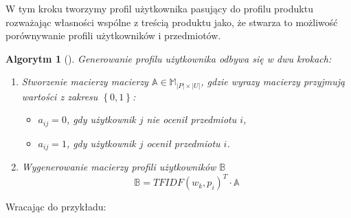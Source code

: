 \documentclass[12pt,a4paper]{report}
\newtheorem{algorytm}[df]{Algorytm}
\newcommand{\set}[1]{\left\lbrace {#1} \right\rbrace}
\newcommand{\setUzytkownicy}{\mathit{U}}
\newcommand{\setPrzedmioty}{\mathit{P}}
\begin{document}
W tym kroku tworzymy profil użytkownika pasujący do profilu produktu rozważając własności wspólne z treścią produktu jako, że stwarza to możliwość porównywanie profili użytkowników i przedmiotów.

\begin{algorytm}[{\citep[Sec 3]{bre}}]
Generowanie profilu użytkownika odbywa się w dwu krokach:
\begin{enumerate}
\item Stworzenie macierzy macierzy $\mathbb{A} \in \mathbb{M}_{|\setPrzedmioty| \times |\setUzytkownicy| }$, gdzie wyrazy macierzy przyjmują wartości z zakresu $\set{0,1}$:
\begin{itemize}
\item $a_{ij} = 0$, gdy użytkownik $j$ nie ocenił przedmiotu $i$,
\item $a_{ij} = 1$, gdy użytkownik $j$ ocenił przedmiotu $i$.
\end{itemize}
\item Wygenerowanie macierzy profili użytkowników $\mathbb{B}$
$$
\mathbb{B} = TFIDF(w_k, p_i)^T \cdot \mathbb{A}
$$
\end{enumerate} 

\end{algorytm}

Wracając do przykładu:
\end{document}
